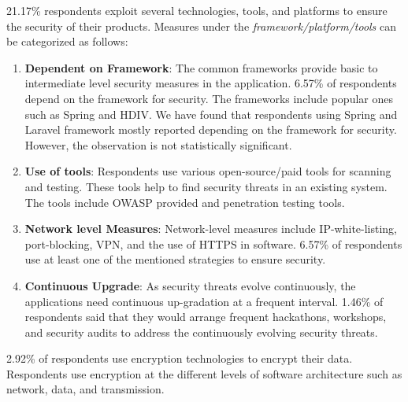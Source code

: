 21.17\% respondents exploit several technologies, tools, and platforms to ensure the security of their products. Measures under the \emph{framework/platform/tools} can be categorized as follows:

\begin{enumerate}[label=(\alph*)]
  \item \textbf{Dependent on Framework}: The common frameworks provide basic to intermediate level security measures in the application. 6.57\% of respondents depend on the framework for security. The frameworks include popular ones such as Spring and HDIV. We have found that respondents using Spring and Laravel framework mostly reported depending on the framework for security. However, the observation is not statistically significant.
  
  \item \textbf{Use of tools}: Respondents use various open-source/paid tools for scanning and testing. These tools help to find security threats in an existing system. The tools include OWASP provided and penetration testing tools.
  
  \item \textbf{Network level Measures}: Network-level measures include IP-white-listing, port-blocking, VPN, and the use of HTTPS in software. 6.57\% of respondents use at least one of the mentioned strategies to ensure security.

  \item \textbf{Continuous Upgrade}: As security threats evolve continuously, the applications need continuous up-gradation at a frequent interval. 1.46\% of respondents said that they would arrange frequent hackathons, workshops, and security audits to address the continuously evolving security threats.
\end{enumerate}

2.92\% of respondents use encryption technologies to encrypt their data. Respondents use encryption at the different levels of software architecture such as network, data, and transmission.


